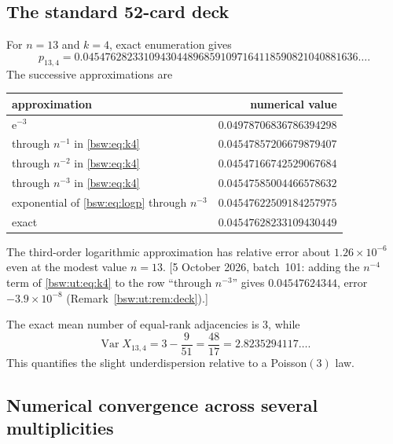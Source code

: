 \documentclass[11pt,letterpaper]{article}
\theoremstyle{definition}
\theoremstyle{remark}
\newcommand{\ee}{\mathrm e}
\newcommand{\Var}{\operatorname{Var}}
\begin{document}
\subsection{The standard 52-card deck}

For $n=13$ and $k=4$, exact enumeration gives
\begin{equation}\label{bsw:eq:deck-prob}
 p_{13,4}=
 0.04547628233109430448968591097164118590821040881636\ldots.
\end{equation}
The successive approximations are
\begin{center}
\begin{tabular}{lr}
\toprule
approximation & numerical value\\
\midrule
$\ee^{-3}$ & $0.04978706836786394298$\\
through $n^{-1}$ in \eqref{bsw:eq:k4} & $0.04547857206679879407$\\
through $n^{-2}$ in \eqref{bsw:eq:k4} & $0.04547166742529067684$\\
through $n^{-3}$ in \eqref{bsw:eq:k4} & $0.04547585004466578632$\\
exponential of \eqref{bsw:eq:logp} through $n^{-3}$
& $0.04547622509184257975$\\
exact & $0.04547628233109430449$\\
\bottomrule
\end{tabular}
\end{center}
The third-order logarithmic approximation has relative error about
$1.26\times10^{-6}$ even at the modest value $n=13$.
[5 October 2026, batch~101: adding the $n^{-4}$ term of
\eqref{bsw:ut:eq:k4} to the row ``through $n^{-3}$'' gives
$0.04547624344$, error $-3.9\times10^{-8}$
(Remark~\ref{bsw:ut:rem:deck}).]

The exact mean number of equal-rank adjacencies is $3$, while
\[
 \Var X_{13,4}=3-\frac9{51}=\frac{48}{17}=2.8235294117\ldots.
\]
This quantifies the slight underdispersion relative to a Poisson$(3)$ law.

\subsection{Numerical convergence across several multiplicities}
\end{document}
